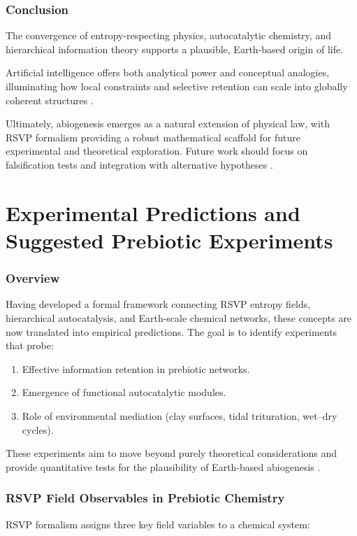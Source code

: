 \documentclass[openany]{book}
\begin{document}
\section{Conclusion}
The convergence of entropy-respecting physics, autocatalytic chemistry, and hierarchical information theory supports a plausible, Earth-based origin of life.

Artificial intelligence offers both analytical power and conceptual analogies, illuminating how local constraints and selective retention can scale into globally coherent structures \citep{day2024}.

Ultimately, abiogenesis emerges as a natural extension of physical law, with RSVP formalism providing a robust mathematical scaffold for future experimental and theoretical exploration. Future work should focus on falsification tests and integration with alternative hypotheses \citep{deamer2017}.

\part{Experimental Predictions and Suggested Prebiotic Experiments}

\section{Overview}
Having developed a formal framework connecting RSVP entropy fields, hierarchical autocatalysis, and Earth-scale chemical networks, these concepts are now translated into empirical predictions. The goal is to identify experiments that probe:

\begin{enumerate}
\item Effective information retention in prebiotic networks.
\item Emergence of functional autocatalytic modules.
\item Role of environmental mediation (clay surfaces, tidal trituration, wet–dry cycles).
\end{enumerate}

These experiments aim to move beyond purely theoretical considerations and provide quantitative tests for the plausibility of Earth-based abiogenesis \citep{sokolskyi2024}.

\section{RSVP Field Observables in Prebiotic Chemistry}
RSVP formalism assigns three key field variables to a chemical system:
\end{document}
